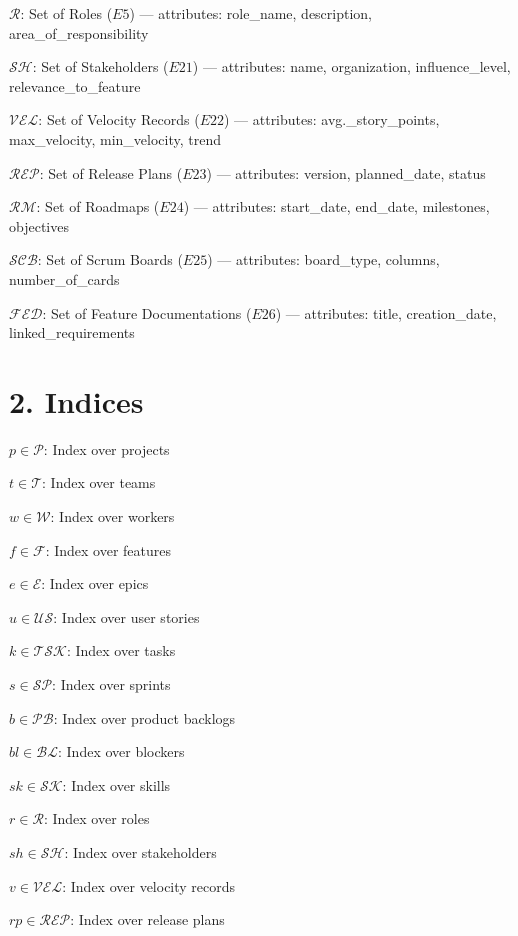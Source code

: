 \documentclass[12pt]{article}
\begin{document}
    \item $\mathcal{R}$: Set of Roles ($E5$) — attributes: role\_name, description, area\_of\_responsibility
    \item $\mathcal{SH}$: Set of Stakeholders ($E21$) — attributes: name, organization, influence\_level, relevance\_to\_feature
    \item $\mathcal{VEL}$: Set of Velocity Records ($E22$) — attributes: avg.\_story\_points, max\_velocity, min\_velocity, trend
    \item $\mathcal{REP}$: Set of Release Plans ($E23$) — attributes: version, planned\_date, status
    \item $\mathcal{RM}$: Set of Roadmaps ($E24$) — attributes: start\_date, end\_date, milestones, objectives
    \item $\mathcal{SCB}$: Set of Scrum Boards ($E25$) — attributes: board\_type, columns, number\_of\_cards
    \item $\mathcal{FED}$: Set of Feature Documentations ($E26$) — attributes: title, creation\_date, linked\_requirements

\section{2. Indices}
\item $p \in \mathcal{P}$: Index over projects
    \item $t \in \mathcal{T}$: Index over teams
    \item $w \in \mathcal{W}$: Index over workers
    \item $f \in \mathcal{F}$: Index over features
    \item $e \in \mathcal{E}$: Index over epics
    \item $u \in \mathcal{US}$: Index over user stories
    \item $k \in \mathcal{TSK}$: Index over tasks
    \item $s \in \mathcal{SP}$: Index over sprints
    \item $b \in \mathcal{PB}$: Index over product backlogs
    \item $bl \in \mathcal{BL}$: Index over blockers
    \item $sk \in \mathcal{SK}$: Index over skills
    \item $r \in \mathcal{R}$: Index over roles
    \item $sh \in \mathcal{SH}$: Index over stakeholders
    \item $v \in \mathcal{VEL}$: Index over velocity records
    \item $rp \in \mathcal{REP}$: Index over release plans
\end{document}
